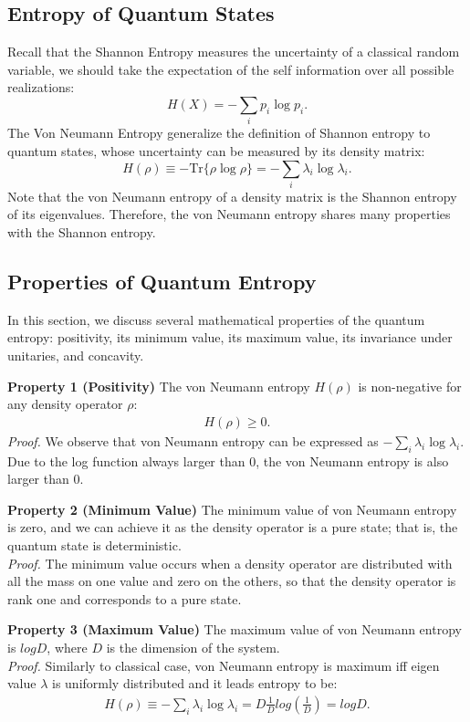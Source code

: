 \subsection{Entropy of Quantum States}
Recall that the Shannon Entropy measures the uncertainty of a classical random variable, we should take the expectation of the self information over all possible realizations:
\begin{equation*}
H(X) = -\sum_i p_i \log p_i.
\end{equation*}
The Von Neumann Entropy generalize the definition of Shannon entropy to quantum states, whose uncertainty can be measured by its density matrix:
\begin{equation*}
H(\rho) \equiv - \text{Tr} \{ \rho \log \rho \} = -\sum_{i} \lambda_i \log \lambda_i.
\end{equation*}
Note that the von Neumann entropy of a density matrix is the Shannon entropy of its eigenvalues. Therefore, the von Neumann entropy shares many properties with the Shannon entropy.

\subsection{Properties of  Quantum Entropy}
In this section, we discuss several mathematical properties of the quantum entropy: positivity, its minimum value, its maximum value, its invariance under unitaries, and concavity.

\textbf{Property 1 (Positivity)} The von Neumann entropy $H(\rho)$ is non-negative for any density operator $\rho$:
\begin{align*}
H(\rho) \geq 0.
\end{align*}
\textit{Proof.} We observe that von Neumann entropy can be expressed as  $-\sum_{i} \lambda_i \log \lambda_i$. Due to the log function always larger than 0, the von Neumann entropy is also larger than 0.

\textbf{Property 2 (Minimum Value)}
The minimum value of von Neumann entropy is zero, and we can achieve it as the density operator is a pure state; that is, the quantum state is deterministic. \\
\textit{Proof.} The minimum value occurs when a density operator are distributed with all the mass on one value and zero on the others, so that the density operator is rank one and corresponds to a pure state.

\textbf{Property 3 (Maximum Value)}
The maximum value of von Neumann entropy is $logD$, where $D$ is the dimension of the system. \\
\textit{Proof.} Similarly to classical case, von Neumann entropy is maximum iff eigen value $\lambda$ is uniformly distributed and it leads entropy to be:
\begin{align*}
H(\rho) \equiv -\sum_{i} \lambda_i \log \lambda_i = D\frac{1}{D} log(\frac{1}{D})=logD.
\end{align*}

